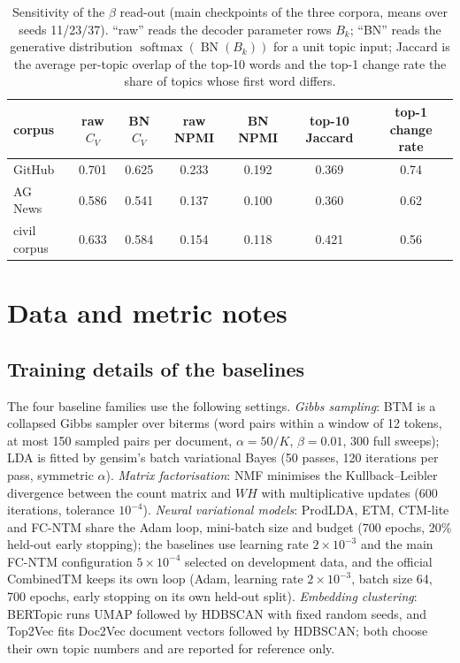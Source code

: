 \documentclass[11pt]{article}
\begin{document}
\begin{table}[t]
\centering
\caption{Sensitivity of the $\beta$ read-out (main checkpoints of the three corpora, means over seeds 11/23/37). ``raw'' reads the decoder parameter rows $B_k$; ``BN'' reads the generative distribution $\operatorname{softmax}(\operatorname{BN}(B_k))$ for a unit topic input; Jaccard is the average per-topic overlap of the top-10 words and the top-1 change rate the share of topics whose first word differs.}
\label{tab:beta-readout}
\small
\setlength{\tabcolsep}{4pt}
\begin{tabular}{@{}lcccccc@{}}
\toprule
corpus & raw $C_V$ & BN $C_V$ & raw NPMI & BN NPMI & top-10 Jaccard & top-1 change rate \\
\midrule
GitHub & 0.701 & 0.625 & 0.233 & 0.192 & 0.369 & 0.74 \\
AG News & 0.586 & 0.541 & 0.137 & 0.100 & 0.360 & 0.62 \\
civil corpus & 0.633 & 0.584 & 0.154 & 0.118 & 0.421 & 0.56 \\
\bottomrule
\end{tabular}
\end{table}

\section{Data and metric notes}

\subsection*{Training details of the baselines}

The four baseline families use the following settings. \emph{Gibbs sampling}: BTM is a collapsed
Gibbs sampler over biterms (word pairs within a window of 12 tokens, at most 150 sampled pairs per
document, $\alpha=50/K$, $\beta=0.01$, 300 full sweeps); LDA is fitted by gensim's batch variational
Bayes (50 passes, 120 iterations per pass, symmetric $\alpha$). \emph{Matrix factorisation}: NMF
minimises the Kullback--Leibler divergence between the count matrix and $WH$ with multiplicative
updates (600 iterations, tolerance $10^{-4}$). \emph{Neural variational models}: ProdLDA, ETM,
CTM-lite and FC-NTM share the Adam loop, mini-batch size and budget (700 epochs, 20\% held-out early
stopping); the baselines use learning rate $2\times10^{-3}$ and the main FC-NTM configuration
$5\times10^{-4}$ selected on development data, and the official CombinedTM keeps its own loop
(Adam, learning rate $2\times10^{-3}$, batch size 64, 700 epochs, early stopping on its own held-out
split). \emph{Embedding clustering}: BERTopic runs UMAP followed by HDBSCAN with fixed random
seeds, and Top2Vec fits Doc2Vec document vectors followed by HDBSCAN; both choose their own topic
numbers and are reported for reference only.
\end{document}
